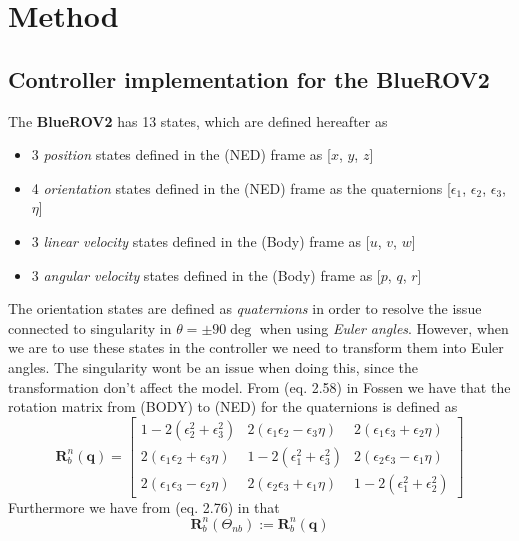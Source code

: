 \chapter{Method} \label{chap:method}
\section{Controller implementation for the BlueROV2}
The \textbf{BlueROV2} has 13 states, which are defined hereafter as
\begin{itemize}
    \item 3 \textit{position} states defined in the (NED) frame as [$x$, $y$, $z$]
    \item 4 \textit{orientation} states defined in the (NED) frame as the quaternions [$\epsilon_{1}$, $\epsilon_{2}$, $\epsilon_{3}$, $\eta$]
    \item 3 \textit{linear velocity} states defined in the (Body) frame as [$u$, $v$, $w$]
    \item 3 \textit{angular velocity} states defined in the (Body) frame as [$p$, $q$, $r$]
\end{itemize}
The orientation states are defined as \textit{quaternions} in order to resolve the issue connected to singularity in $\theta = \pm 90 \deg$ when using \textit{Euler angles}. However, when we are to use these states in the controller we need to transform them into Euler angles. The singularity wont be an issue when doing this, since the transformation don't affect the model. From (eq. 2.58) in Fossen \cite{Fossen} we have that the rotation matrix from (BODY) to (NED) for the quaternions is defined as
\begin{equation}
    \mathbf{R}_{b}^{n}(\mathbf{q}) = 
    \begin{bmatrix}
    1 - 2(\epsilon_{2}^{2}+\epsilon_{3}^{2}) & 2(\epsilon_{1}\epsilon_{2}-\epsilon_{3}\eta) & 2(\epsilon_{1}\epsilon_{3}+\epsilon_{2}\eta) \\
    2(\epsilon_{1}\epsilon_{2}+\epsilon_{3}\eta) & 1 - 2(\epsilon_{1}^{2}+\epsilon_{3}^{2}) & 2(\epsilon_{2}\epsilon_{3}-\epsilon_{1}\eta) \\
    2(\epsilon_{1}\epsilon_{3}-\epsilon_{2}\eta) & 2(\epsilon_{2}\epsilon_{3}+\epsilon_{1}\eta) & 1 - 2(\epsilon_{1}^{2}+\epsilon_{2}^{2})
    \end{bmatrix}
\end{equation}
Furthermore we have from (eq. 2.76) in that 
\begin{equation}
    \mathbf{R}_{b}^{n}(\Theta_{nb}) := \mathbf{R}_{b}^{n}(\mathbf{q})
\end{equation}
